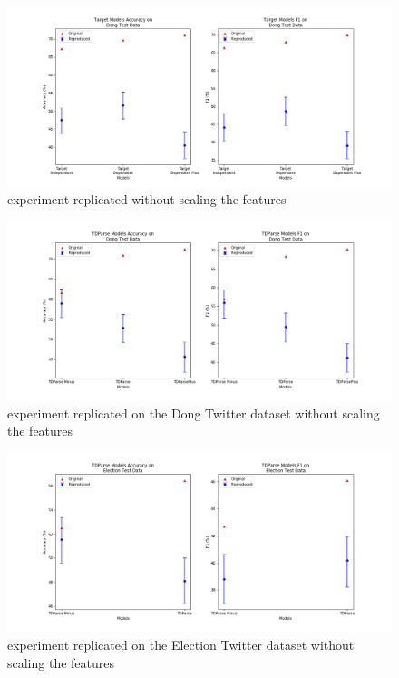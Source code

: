 \begin{figure}[!htb]
    \centering
    \includegraphics[scale=0.35]{images/reproducibility/Parameters/Scaling/Target_Replication_not_scaled_Dong.png}
    \caption{\citet{vo2015target} experiment replicated without scaling the features}
    \label{fig:repro_param_scaling_target_exp}
\end{figure}
\begin{figure}[!htb]
    \centering
    \includegraphics[scale=0.35]{images/reproducibility/Parameters/Scaling/TDParse_Replication_not_scaled_Dong.png}
    \caption{\citet{wang-etal-2017-tdparse} experiment replicated on the Dong Twitter dataset without scaling the features}
    \label{fig:repro_param_scaling_tdparse_dong}
\end{figure}
\begin{figure}[!htb]
    \centering
    \includegraphics[scale=0.35]{images/reproducibility/Parameters/Scaling/TDParse_Replication_not_scaled_Election.png}
    \caption{\citet{wang-etal-2017-tdparse} experiment replicated on the Election Twitter dataset without scaling the features}
    \label{fig:repro_param_scaling_tdparse_election}
\end{figure}
